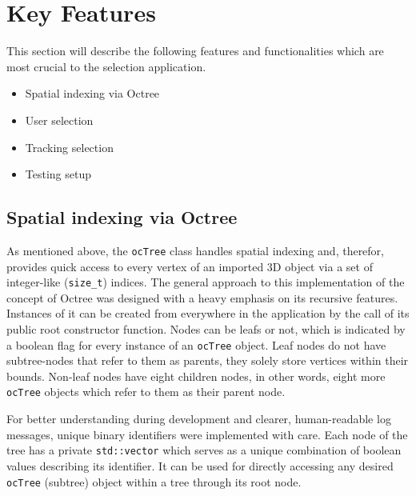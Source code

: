 \section{Key Features}
\label{sec:key_features}
This section will describe the following features and functionalities which are most crucial to the selection application.

\begin{itemize}  
	\item Spatial indexing via Octree
	\item User selection
	\item Tracking selection
	\item Testing setup 
\end{itemize}

\subsection{Spatial indexing via Octree}
\label{sec:spatial_indexing_via_octree}

As mentioned above, the \texttt{ocTree} class handles spatial indexing and, therefor, provides quick access to every vertex of an imported 3D object via a set of integer-like (\texttt{size\_t}) indices. The general approach to this implementation of the concept of Octree was designed with a heavy emphasis on its recursive features. Instances of it can be created from everywhere in the application by the call of its public root constructor function. Nodes can be leafs or not, which is indicated by a boolean flag for every instance of an \texttt{ocTree} object. Leaf nodes do not have subtree-nodes that refer to them as parents, they solely store vertices within their bounds. Non-leaf nodes have eight children nodes, in other words, eight more \texttt{ocTree} objects which refer to them as their parent node.

For better understanding during development and clearer, human-readable log messages, unique binary identifiers were implemented with care. Each node of the tree has a private \texttt{std::vector} which serves as a unique combination of boolean values describing its identifier. It can be used for directly accessing any desired \texttt{ocTree} (subtree) object within a tree through its root node.

